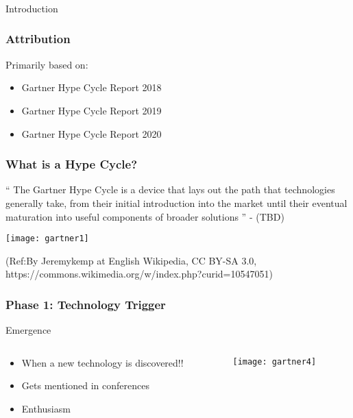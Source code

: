 \begin{frame}[fragile]\frametitle{}
\begin{center}
{\Large Introduction}
\end{center}
\end{frame}

\begin{frame}[fragile]\frametitle{Attribution}

Primarily based on:
\begin{itemize}
\item Gartner Hype Cycle Report 2018
\item Gartner Hype Cycle Report 2019
\item Gartner Hype Cycle Report 2020
\end{itemize}
\end{frame}

\begin{frame}[fragile]\frametitle{What is a Hype Cycle?}

`` The Gartner Hype Cycle is a device that lays out the path that technologies generally take, from their initial introduction into the market until their eventual maturation into useful components of broader solutions '' - (TBD)


\begin{center}
\texttt{[image: gartner1]}
\end{center}

{\tiny (Ref:By Jeremykemp at English Wikipedia, CC BY-SA 3.0, https://commons.wikimedia.org/w/index.php?curid=10547051)}

\end{frame}

\begin{frame}[fragile]\frametitle{Phase 1: Technology Trigger}


Emergence

 \begin{columns}
  \begin{column}{0.55\linewidth}
\begin{itemize}
\item When a new technology is discovered!!
\item Gets mentioned in conferences
\item Enthusiasm
\end{itemize}
  \end{column}%
  \begin{column}{0.45\linewidth}
			\begin{center}
			\texttt{[image: gartner4]}
			\end{center}
  \end{column}
 \end{columns}
 
\end{frame}

